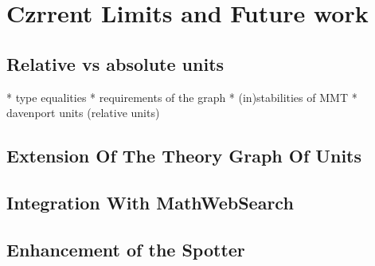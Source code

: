 \section{Czrrent Limits and Future work}
\label{sec:future}
\subsection{Relative vs absolute units}
* type equalities
* requirements of the graph
* (in)stabilities of MMT
* davenport units (relative units)

\subsection{Extension Of The Theory Graph Of Units}
\subsection{Integration With MathWebSearch}
\subsection{Enhancement of the Spotter}



